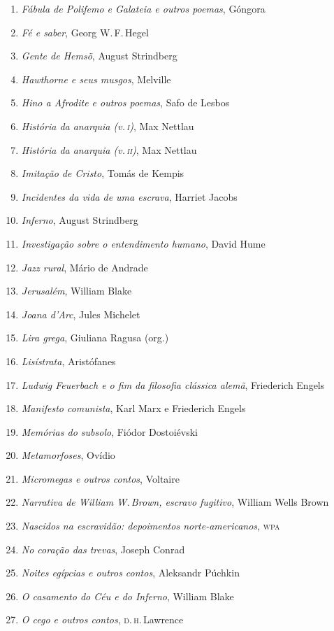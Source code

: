 \begin{enumerate}
\item \textit{Fábula de Polifemo e Galateia e outros poemas}, Góngora
\item \textit{Fé e saber}, Georg W.\,F.\,Hegel
\item \textit{Gente de Hemsö}, August Strindberg 
\item \textit{Hawthorne e seus musgos}, Melville
\item \textit{Hino a Afrodite e outros poemas}, Safo de Lesbos 
\item \textit{História da anarquia (v.\,\textsc{i})}, Max Nettlau
\item \textit{História da anarquia (v.\,\textsc{ii})}, Max Nettlau
\item \textit{Imitação de Cristo}, Tomás de Kempis
\item \textit{Incidentes da vida de uma escrava}, Harriet Jacobs
\item \textit{Inferno}, August Strindberg
\item \textit{Investigação sobre o entendimento humano}, David Hume
\item \textit{Jazz rural}, Mário de Andrade
\item \textit{Jerusalém}, William Blake
\item \textit{Joana d'Arc}, Jules Michelet
\item \textit{Lira grega}, Giuliana Ragusa (org.)
\item \textit{Lisístrata}, Aristófanes 
\item \textit{Ludwig Feuerbach e o fim da filosofia clássica alemã}, Friederich Engels
\item \textit{Manifesto comunista}, Karl Marx e Friederich Engels
\item \textit{Memórias do subsolo}, Fiódor Dostoiévski
\item \textit{Metamorfoses}, Ovídio
\item \textit{Micromegas e outros contos}, Voltaire
\item \textit{Narrativa de William W.\,Brown, escravo fugitivo}, William Wells Brown
\item \textit{Nascidos na escravidão: depoimentos norte-americanos}, \textsc{wpa}
\item \textit{No coração das trevas}, Joseph Conrad
\item \textit{Noites egípcias e outros contos}, Aleksandr Púchkin
\item \textit{O casamento do Céu e do Inferno}, William Blake
\item \textit{O cego e outros contos}, \textsc{d.\,h}.\,Lawrence

\end{enumerate}
